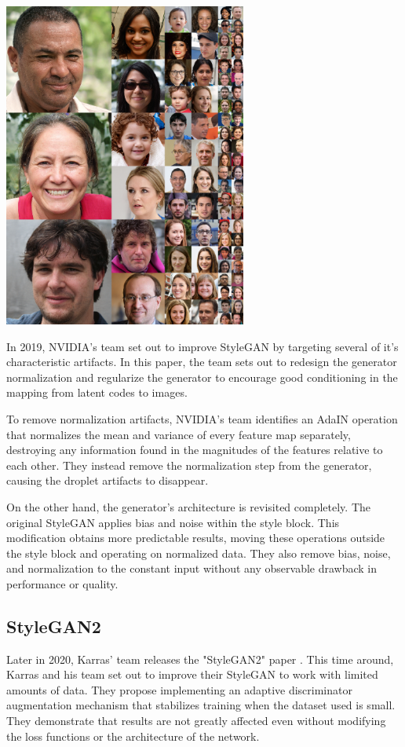 \begin{Figure}[h]
 \centering
 \includegraphics[width=8cm]{resources/styleface.png}
 \label{fig:style_face}
\end{Figure}


In 2019, NVIDIA's team set out to improve StyleGAN by targeting several of it's characteristic artifacts\cite{DBLP:journals/corr/abs-1912-04958}. In this paper, the team sets out to redesign the generator normalization and regularize the generator to encourage good conditioning in the mapping from latent codes to images. 

To remove normalization artifacts, NVIDIA's team identifies an AdaIN operation that normalizes the mean and variance of every feature map separately, destroying any information found in the magnitudes of the features relative to each other. They instead remove the normalization step from the generator, causing the droplet artifacts to disappear.

On the other hand, the generator's architecture is revisited completely. The original StyleGAN applies bias and noise within the style block. 
This modification obtains more predictable results, moving these operations outside the style block and operating on normalized data. They also remove bias, noise, and normalization to the constant input without any observable drawback in performance or quality.

\subsection{StyleGAN2}
Later in 2020, Karras' team releases the "StyleGAN2" paper \cite{DBLP:journals/corr/abs-2006-06676}. This time around, Karras and his team set out to improve their StyleGAN to work with limited amounts of data. They propose implementing an adaptive discriminator augmentation mechanism that stabilizes training when the dataset used is small. They demonstrate that results are not greatly affected even without modifying the loss functions or the architecture of the network.